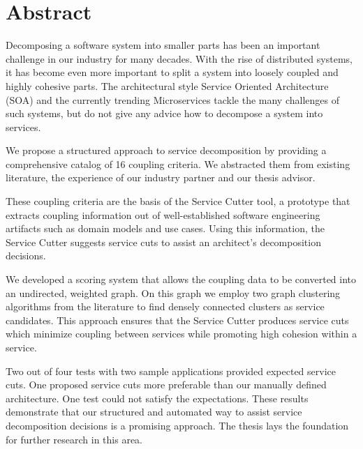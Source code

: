 \chapter{Abstract}

Decomposing a software system into smaller parts has been an important challenge in our industry for many decades. With the rise of distributed systems, it has become even more important to split a system into loosely coupled and highly cohesive parts. The architectural style Service Oriented Architecture (SOA) and the currently trending Microservices tackle the many challenges of such systems, but do not give any advice how to decompose a system into services.

We propose a structured approach to service decomposition by providing a comprehensive catalog of 16 coupling criteria. We abstracted them from existing literature, the experience of our industry partner and our thesis advisor. 

These coupling criteria are the basis of the Service Cutter tool, a prototype that extracts coupling information out of well-established software engineering artifacts such as domain models and use cases. Using this information, the Service Cutter suggests service cuts to assist an architect’s decomposition decisions. 

We developed a scoring system that allows the coupling data to be converted into an undirected, weighted graph. On this graph we employ two graph clustering algorithms from the literature to find densely connected clusters as service candidates. This approach ensures that the Service Cutter produces service cuts which minimize coupling between services while promoting high cohesion within a service.

Two out of four tests with two sample applications provided expected service cuts. One proposed service cuts more preferable than our manually defined architecture. One test could not satisfy the expectations. These results demonstrate that our structured and automated way to assist service decomposition decisions is a promising approach. The thesis lays the foundation for further research in this area.